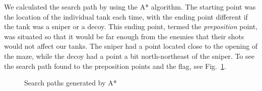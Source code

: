 \documentclass{article}
\begin{document}
We calculated the search path by using the A* algorithm.  The starting point was the location of the individual tank each time, with the ending point different if the tank was a sniper or a decoy.  This ending point, termed the \emph{preposition} point, was situated so that it would be far enough from the enemies that their shots would not affect our tanks.  The sniper had a point located close to the opening of the maze, while the decoy had a point a bit north-northeast of the sniper. To see the search path found to the preposition points and the flag, see Fig.~\ref{fig:searchpaths}.
\begin{figure}[h!]
	\caption{Search paths generated by A*}
	\label{fig:searchpaths}
\end{figure}
\end{document}
